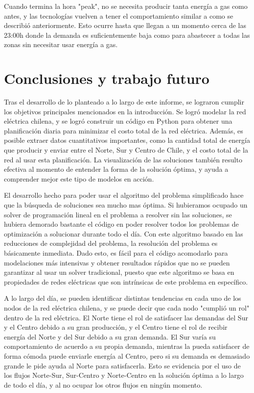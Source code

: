 \documentclass[12pt,twoside]{article}
\begin{document}
	\hspace{1cm} Cuando termina la hora "peak", no se necesita producir tanta energ\'ia a gas como antes, y las tecnolog\'ias vuelven a tener el comportamiento similar a como se describi\'o anteriormente. Esto ocurre hasta que llegan a un momento cerca de las 23:00h donde la demanda es suficientemente baja como para abastecer a todas las zonas sin necesitar usar energ\'ia a gas.

	\section{Conclusiones y trabajo futuro}
	\hspace{1cm} Tras el desarrollo de lo planteado a lo largo de este informe, se lograron cumplir los objetivos principales mencionados en la introducci\'on. Se logr\'o modelar la red el\'ectrica chilena, y se logr\'o construir un c\'odigo en Python para obtener una planificaci\'on diaria para minimizar el costo total de la red el\'ectrica. Adem\'as, es posible extraer datos cuantitativos importantes, como la cantidad total de energ\'ia que producir y enviar entre el Norte, Sur y Centro de Chile, y el costo total de la red al usar esta planificaci\'on. La visualizaci\'on de las soluciones tambi\'en resulto efectiva al momento de entender la forma de la soluci\'on \'optima, y ayuda a comprender mejor este tipo de modelos en acci\'on.
	
	\hspace{1cm} El desarrollo hecho para poder usar el algoritmo del problema simplificado hace que la b\'usqueda de soluciones sea mucho mas \'optima. Si hubieramos ocupado un solver de programaci\'on lineal en el problema a resolver sin las soluciones, se hubiera demorado bastante el c\'odigo en poder resolver todos los problemas de optimizaci\'on a solucionar durante todo el d\'ia. Con este algoritmo basado en las reducciones de complejidad del problema, la resoluci\'on del problema es b\'asicamente inmediata. Dado esto, es f\'acil para el c\'odigo acomodarlo para modelaciones m\'as intensivas y obtener resultados r\'apidos que no se pueden garantizar al usar un solver tradicional, puesto que este algoritmo se basa en propiedades de redes el\'ectricas que son intr\'insicas de este problema en espec\'ifico.
	
	\hspace{1cm} A lo largo del d\'ia, se pueden identificar distintas tendencias en cada uno de los nodos de la red el\'ectrica chilena, y se puede decir que cada nodo "cumpli\'o un rol" dentro de la red el\'ectrica. El Norte tiene el rol de satisfacer las demandas del Sur y el Centro debido a su gran producci\'on, y el Centro tiene el rol de recibir energ\'ia del Norte y del Sur debido a su gran demanda. El Sur var\'ia su comportamiento de acuerdo a su propia demanda, mientras la pueda satisfacer de forma c\'omoda puede enviarle energ\'ia al Centro, pero si su demanda es demasiado grande le pide ayuda al Norte para satisfacerla. Esto se evidencia por el uso de los flujos Norte-Sur, Sur-Centro y Norte-Centro en la soluci\'on \'optima a lo largo de todo el d\'ia, y al no ocupar los otros flujos en ning\'un momento.
	
\end{document}
